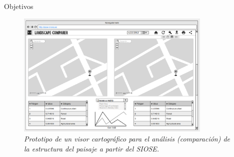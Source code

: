 
\begin{frame}{Objetivos}

\begin{figure}
\includegraphics[height=6cm]{Prologo/Figs/visorweb} 
\caption{\textit{Prototipo de un visor cartográfico para el análisis (comparación) de la estructura del paisaje a partir del SIOSE.}}
\end{figure}


\end{frame}


